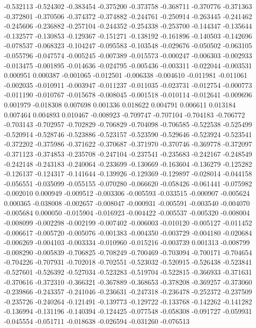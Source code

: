 -0.532113
-0.524302
-0.383454
-0.375200
-0.373758
-0.368711
-0.370776
-0.371363
-0.372801
-0.370506
-0.374372
-0.374882
-0.244761
-0.250914
-0.263445
-0.241462
-0.245606
-0.236882
-0.257104
-0.244352
-0.254338
-0.253700
-0.144347
-0.135644
-0.132577
-0.130853
-0.129367
-0.151271
-0.138192
-0.161896
-0.140503
-0.142696
-0.078537
-0.068323
-0.104247
-0.095583
-0.103548
-0.029676
-0.050502
-0.063105
-0.055796
-0.047574
-0.005245
-0.007389
-0.015573
-0.000247
-0.006303
-0.002933
-0.013475
-0.001895
-0.014636
-0.024795
-0.005436
-0.003311
-0.022044
-0.003531
0.000951
0.000387
-0.001065
-0.012501
-0.006338
-0.004610
-0.011981
-0.011061
-0.002035
-0.010911
-0.003947
-0.011237
-0.011035
-0.023731
-0.012754
-0.000773
-0.011190
-0.010767
-0.015678
-0.008045
-0.001518
-0.010114
-0.012641
-0.009696
0.001979
-0.018308
0.007698
0.001336
0.018622
0.004791
0.006611
0.013184
0.007464
0.004893
0.010467
-0.008923
-0.709747
-0.707104
-0.704183
-0.706772
-0.703143
-0.702957
-0.702829
-0.706829
-0.704098
-0.706585
-0.522538
-0.525499
-0.520914
-0.528746
-0.523886
-0.523157
-0.523590
-0.529646
-0.523924
-0.523541
-0.372202
-0.375986
-0.371622
-0.370687
-0.371970
-0.370746
-0.369778
-0.372097
-0.371123
-0.374853
-0.235708
-0.247104
-0.237541
-0.235683
-0.242167
-0.248549
-0.242148
-0.243183
-0.240064
-0.233699
-0.130669
-0.163604
-0.136279
-0.125282
-0.126137
-0.124317
-0.141644
-0.139926
-0.129369
-0.129897
-0.028014
-0.044158
-0.056551
-0.035099
-0.055155
-0.070280
-0.066620
-0.058426
-0.061441
-0.075982
-0.002010
0.000949
-0.009512
-0.003306
-0.005593
-0.033515
-0.000907
-0.005624
0.000365
-0.038008
-0.002657
-0.008047
-0.000931
-0.005591
-0.003540
-0.004070
-0.005684
0.000050
-0.015904
-0.016923
-0.004422
-0.005537
-0.005320
-0.008004
-0.008099
-0.002298
-0.002199
-0.007402
-0.006003
-0.010120
-0.005127
-0.011452
-0.006617
-0.005720
-0.005076
-0.001383
-0.004350
-0.003729
-0.004180
-0.020684
-0.006269
-0.004103
-0.003334
-0.010960
-0.015216
-0.003739
0.001313
-0.008799
-0.008290
-0.005839
-0.706825
-0.708249
-0.700469
-0.703094
-0.700171
-0.704654
-0.704226
-0.707931
-0.702018
-0.702551
-0.523032
-0.520915
-0.526438
-0.523841
-0.527601
-0.526392
-0.527034
-0.523283
-0.519704
-0.522815
-0.366933
-0.371631
-0.370616
-0.372310
-0.366321
-0.367889
-0.368653
-0.378208
-0.369257
-0.373060
-0.239866
-0.243357
-0.241046
-0.236631
-0.247318
-0.236478
-0.252372
-0.237509
-0.235726
-0.240264
-0.121491
-0.139773
-0.129722
-0.133768
-0.142262
-0.141282
-0.136994
-0.131196
-0.140394
-0.124425
-0.077548
-0.058308
-0.091727
-0.059931
-0.045554
-0.051711
-0.018638
-0.026594
-0.031260
-0.076513
